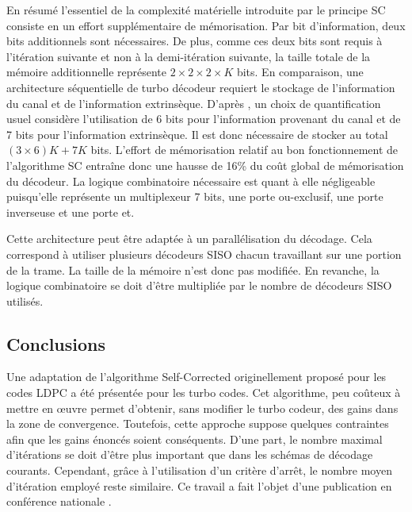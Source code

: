 En résumé l'essentiel de la complexité matérielle introduite par le principe SC consiste en un effort supplémentaire de mémorisation. Par bit 
d'information, deux bits additionnels sont nécessaires. De plus, comme ces deux bits sont 
requis à l'itération suivante et non à la demi-itération suivante, la taille totale de la mémoire additionnelle 
représente $2\times 2 \times 2 \times K$ bits. En comparaison, une architecture séquentielle de turbo décodeur requiert le stockage
de  l'information du canal et de l'information extrinsèque. D'après \cite{livre_declercq}, un choix de quantification 
usuel considère l'utilisation de 6 bits pour l'information provenant du canal et de 7 bits pour l'information extrinsèque.
Il est donc nécessaire de stocker au total $(3\times 6)K + 7 K$ bits. L'effort de mémorisation relatif au bon 
fonctionnement de l'algorithme SC entraîne donc une hausse de 16\% du coût global de mémorisation du décodeur.
La logique combinatoire nécessaire est quant à elle négligeable puisqu'elle
représente un multiplexeur 7 bits, une porte ou-exclusif, une porte inverseuse et une porte et.

Cette architecture peut être adaptée à un parallélisation du décodage. Cela correspond à utiliser plusieurs décodeurs SISO chacun 
travaillant sur une portion de la trame. La taille de la mémoire n'est donc pas modifiée. En revanche, la logique combinatoire
se doit d'être multipliée par le nombre de décodeurs SISO utilisés.


\subsection{Conclusions}
Une adaptation de l'algorithme Self-Corrected originellement proposé pour les codes LDPC a été présentée pour les turbo 
codes. Cet algorithme, peu coûteux à mettre en œuvre permet d'obtenir, sans modifier le turbo codeur, des gains dans la zone 
de convergence. Toutefois, cette approche suppose quelques contraintes afin que les gains énoncés soient
 conséquents. D'une part, le nombre maximal d'itérations se doit d'être plus important que dans les schémas de 
 décodage courants. Cependant, grâce à l'utilisation d'un critère d'arrêt, le nombre moyen d'itération employé reste 
 similaire. Ce travail a fait l'objet d'une publication en conférence nationale .

